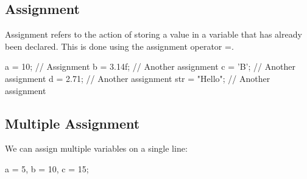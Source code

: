 \documentclass{report}
\begin{document}
    \bigbreak \noindent 
    \subsection{Assignment}
    \bigbreak \noindent 
    Assignment refers to the action of storing a value in a variable that has already been declared. This is done using the assignment operator =.
    \bigbreak \noindent 
    
    \begin{cppcode}
a = 10;            // Assignment
b = 3.14f;         // Another assignment
c = 'B';           // Another assignment
d = 2.71;          // Another assignment
str = "Hello";     // Another assignment
    \end{cppcode}
    
    \bigbreak \noindent 
    \subsection{Multiple Assignment}
    \bigbreak \noindent 
    We can assign multiple variables on a single line:
    \bigbreak \noindent 
    
    \begin{cppcode}
a = 5, b = 10, c = 15;
    \end{cppcode}
    
\end{document}
